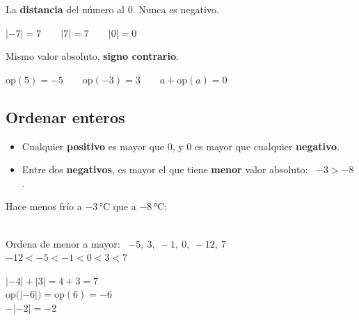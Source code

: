 \documentclass[11pt,a4paper]{article}
\begin{document}
\begin{tcbraster}[raster columns=2,raster equal height,raster column skip=10pt]
\begin{tcolorbox}[fmbase,colback=fmdefbg,colframe=fmdef,coltitle=white,title={Valor absoluto \ $|a|$}]
La \textbf{distancia} del número al 0. Nunca es negativo.\par\smallskip
{\centering$|-7|=7\qquad |7|=7\qquad |0|=0$\par}
\end{tcolorbox}
\begin{tcolorbox}[fmbase,colback=fmdefbg,colframe=fmdef,coltitle=white,title={Opuesto \ $\text{op}(a)=-a$}]
Mismo valor absoluto, \textbf{signo contrario}.\par\smallskip
{\centering$\text{op}(5)=-5\qquad \text{op}(-3)=3\qquad a+\text{op}(a)=0$\par}
\end{tcolorbox}
\end{tcbraster}

\subsection{Ordenar enteros}
\begin{minipage}[t]{0.52\linewidth}
\begin{idea}
\begin{itemize}[leftmargin=1em]
\item Cualquier \textbf{positivo} es mayor que 0, y 0 es mayor que cualquier \textbf{negativo}.
\item Entre dos \textbf{negativos}, es mayor el que tiene \textbf{menor} valor absoluto: \ $-3>-8$.
\end{itemize}
\end{idea}
\end{minipage}\hfill
\begin{minipage}[t]{0.45\linewidth}
\begin{truc}
Hace menos frío a $-3$\,°C que a $-8$\,°C:\\[3pt]
\hspace*{1em}{\Large$-3>-8$} \ \ {\color{fmA}\Large\faThermometerQuarter}
\end{truc}
\end{minipage}

\begin{exemple}[Ejemplos]
\begin{minipage}[t]{0.5\linewidth}
Ordena de menor a mayor: \ $-5,\ 3,\ -1,\ 0,\ -12,\ 7$\\[4pt]
{\large$-12<-5<-1<0<3<7$}
\end{minipage}\hfill
\begin{minipage}[t]{0.47\linewidth}
$|-4|+|3|=4+3=7$\\[3pt]
$\text{op}\big(|-6|\big)=\text{op}(6)=-6$\\[3pt]
$-|-2|=-2$
\end{minipage}
\end{exemple}
\end{document}

